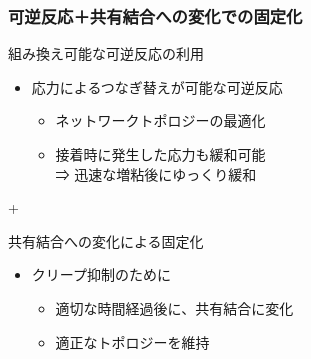 \documentclass[unicode,12pt]{beamer}%
\begin{document}
\begin{frame}
\frametitle{可逆反応＋共有結合への変化での固定化}

\begin{block}{組み換え可能な可逆反応の利用}

\begin{itemize}
    \item
    応力によるつなぎ替えが可能な可逆反応
    \begin{itemize}
        \item
        ネットワークトポロジーの最適化
        \item
        接着時に発生した応力も緩和可能 \\⇒ 迅速な増粘後にゆっくり緩和
    \end{itemize}
\end{itemize}
\end{block}

\vspace{-8mm}
\begin{center}
\LARGE{+}
\end{center}
\vspace{-5mm}

\begin{alertblock}{共有結合への変化による固定化}
    \begin{itemize}
        \item
        クリープ抑制のために
        \begin{itemize}
            \item
            適切な時間経過後に、共有結合に変化
            \item
            適正なトポロジーを維持
        \end{itemize}	
    \end{itemize}
\end{alertblock}
\end{frame}
    
\end{document}
